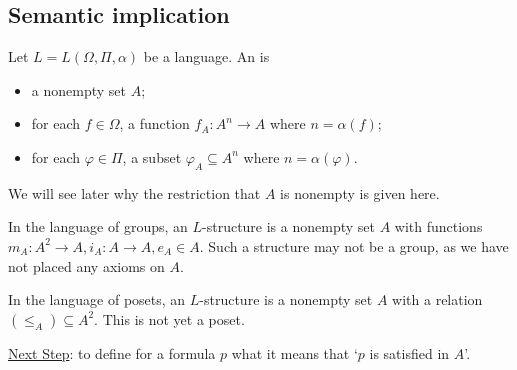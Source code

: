 \subsection{Semantic implication}
\begin{definition}
    Let $L = L(\Omega, \Pi, \alpha)$ be a language.
    An  is
    \begin{itemize}
        \item a nonempty set $A$;
        \item for each $f \in \Omega$, a function $f_A \colon A^n \to A$ where $n = \alpha(f)$;
        \item for each $\varphi \in \Pi$, a subset $\varphi_A \subseteq A^n$ where $n = \alpha(\varphi)$.
    \end{itemize}
\end{definition}

\begin{remark}
    We will see later why the restriction that $A$ is nonempty is given here.
\end{remark}

\begin{example}
    In the language of groups, an $L$-structure is a nonempty set $A$ with functions $m_A \colon A^2 \to A, i_A \colon A \to A, e_A \in A$.
    Such a structure may not be a group, as we have not placed any axioms on $A$.
\end{example}

\begin{example}
    In the language of posets, an $L$-structure is a nonempty set $A$ with a relation $(\leq_A) \subseteq A^2$.
    This is not yet a poset.
\end{example}

\underline{Next Step}: to define for a formula $p$ what it means that `$p$ is satisfied in $A$'.

